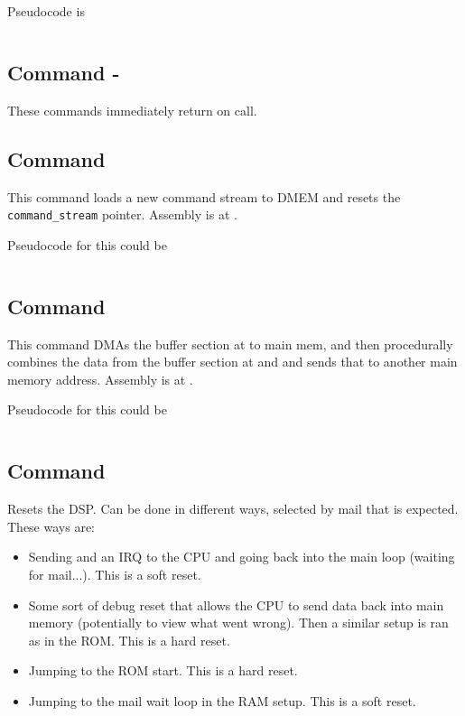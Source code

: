 Pseudocode is

\inputminted{c}{../ucode/command_8.c}

\subsection{Command  - }
These commands immediately return on call.

\subsection{Command }
This command loads a new command stream to DMEM and resets the \texttt{command_stream} pointer. Assembly is at .

Pseudocode for this could be 

\inputminted{c}{../ucode/command_d.c}

\subsection{Command }
This command DMAs the buffer section at  to main mem, and then procedurally combines the data from the buffer section at  and  and sends that to another main memory address. Assembly is at .

Pseudocode for this could be 

\inputminted{c}{../ucode/command_e.c}

\subsection{Command }
Resets the DSP. Can be done in different ways, selected by mail that is expected. These ways are:

\begin{itemize}
    \item Sending  and an IRQ to the CPU and going back into the main loop (waiting for  mail...). This is a soft reset.
    \item Some sort of debug reset that allows the CPU to send data back into main memory (potentially to view what went wrong). Then a similar setup is ran as in the ROM. This is a hard reset.
    \item Jumping to the ROM start. This is a hard reset.
    \item Jumping to the  mail wait loop in the RAM setup. This is a soft reset.
\end{itemize}

